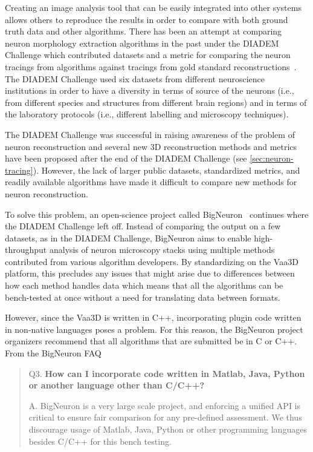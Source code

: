 Creating an image analysis tool that can be easily integrated into
other systems allows others to reproduce the results in order to
compare with both ground truth data and other algorithms. There
has been an attempt at comparing neuron morphology extraction
algorithms in the past under the \acrshort{DIADEM} Challenge which
contributed datasets and a metric for comparing the neuron
tracings from algorithms against tracings from gold standard
reconstructions~\autocite{DIADEM&Beyond:Liu:2011,DIADEM-dataset:Brown:2011,DIADEM-metric-Gillette2011}.
The DIADEM Challenge used six datasets from different neuroscience
institutions in order to have a diversity in terms of source of
the neurons (i.e., from different species and structures from
different brain regions) and in terms of the laboratory protocols
(i.e., different labelling and microscopy techniques).

The DIADEM Challenge was successful in raising awareness of the
problem of neuron reconstruction and several new 3D reconstruction
methods and metrics have been proposed after the end of the DIADEM
Challenge (see \cref{sec:neuron-tracing}).  However, the
lack of larger public datasets, standardized metrics, and readily
available algorithms have made it difficult to compare new methods
for neuron reconstruction.

To solve this problem, an open-science project called
BigNeuron~\autocite{BigNeuron:Peng:2015,DIADEM2BigNeuron:Peng:2015}
continues where the DIADEM Challenge left off. Instead of
comparing the output on a few datasets, as in the DIADEM Challenge,
BigNeuron aims to enable high-throughput analysis of neuron
microscopy stacks using multiple methods contributed from various
algorithm developers. By standardizing on the Vaa3D platform, this
precludes any issues that might arise due to differences between how each method handles data which
means that all the algorithms can be bench-tested at once without
a need for translating data between formats.

However, since the Vaa3D is written in C++, incorporating plugin
code written in non-native languages poses a problem. For this
reason, the BigNeuron project organizers recommend that all
algorithms that are submitted be in C or C++. From the BigNeuron
FAQ~\autocite{BigNeuron:FAQ:2015}\\
\parbox{\textwidth}{
\begin{quote}
	\begin{fancyquote}
		{Q3. \bfseries How can I incorporate code written in Matlab, Java, Python or another language other than C/C++?}

		A. BigNeuron is a very large scale project, and enforcing a
		unified API is critical to ensure fair comparison for any pre-defined
		assessment. We thus discourage usage of Matlab, Java, Python or other
		programming languages besides C/C++ for this bench
		testing.
	\end{fancyquote}
\end{quote}
}

